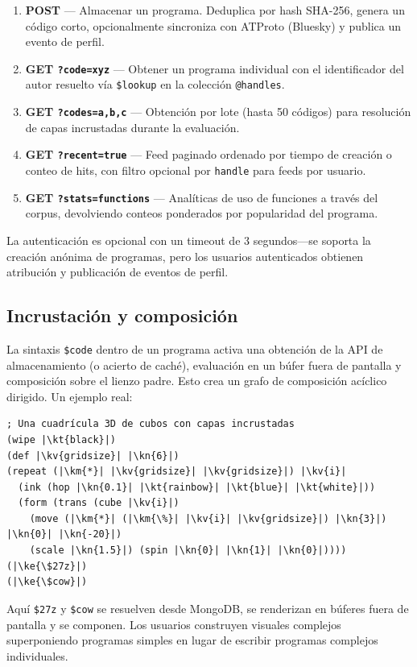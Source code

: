 \documentclass[10pt,letterpaper,twocolumn]{article}
\newcommand{\kn}[1]{\textcolor{klnum}{#1}}
\newcommand{\kt}[1]{\textcolor{klstr}{#1}}
\newcommand{\kv}[1]{\textcolor{klvar}{#1}}
\newcommand{\ke}[1]{\textcolor{klembed}{\textbf{#1}}}
\newcommand{\km}[1]{\textcolor{klmath}{#1}}
\begin{document}
\begin{enumerate}
  \item \textbf{POST} --- Almacenar un programa. Deduplica por hash SHA-256, genera un código corto, opcionalmente sincroniza con ATProto (Bluesky) y publica un evento de perfil.
  \item \textbf{GET \texttt{?code=xyz}} --- Obtener un programa individual con el identificador del autor resuelto vía \texttt{\$lookup} en la colección \texttt{@handles}.
  \item \textbf{GET \texttt{?codes=a,b,c}} --- Obtención por lote (hasta 50 códigos) para resolución de capas incrustadas durante la evaluación.
  \item \textbf{GET \texttt{?recent=true}} --- Feed paginado ordenado por tiempo de creación o conteo de hits, con filtro opcional por \texttt{handle} para feeds por usuario.
  \item \textbf{GET \texttt{?stats=functions}} --- Analíticas de uso de funciones a través del corpus, devolviendo conteos ponderados por popularidad del programa.
\end{enumerate}

La autenticación es opcional con un timeout de 3 segundos---se soporta la creación anónima de programas, pero los usuarios autenticados obtienen atribución y publicación de eventos de perfil.

\subsection{Incrustación y composición}

La sintaxis \texttt{\$code} dentro de un programa activa una obtención de la API de almacenamiento (o acierto de caché), evaluación en un búfer fuera de pantalla y composición sobre el lienzo padre. Esto crea un grafo de composición acíclico dirigido. Un ejemplo real:

\begin{lstlisting}
; Una cuadrícula 3D de cubos con capas incrustadas
(wipe |\kt{black}|)
(def |\kv{gridsize}| |\kn{6}|)
(repeat (|\km{*}| |\kv{gridsize}| |\kv{gridsize}|) |\kv{i}|
  (ink (hop |\kn{0.1}| |\kt{rainbow}| |\kt{blue}| |\kt{white}|))
  (form (trans (cube |\kv{i}|)
    (move (|\km{*}| (|\km{\%}| |\kv{i}| |\kv{gridsize}|) |\kn{3}|) |\kn{0}| |\kn{-20}|)
    (scale |\kn{1.5}|) (spin |\kn{0}| |\kn{1}| |\kn{0}|))))
(|\ke{\$27z}|)
(|\ke{\$cow}|)
\end{lstlisting}

Aquí \texttt{\$27z} y \texttt{\$cow} se resuelven desde MongoDB, se renderizan en búferes fuera de pantalla y se componen. Los usuarios construyen visuales complejos superponiendo programas simples en lugar de escribir programas complejos individuales.
\end{document}
